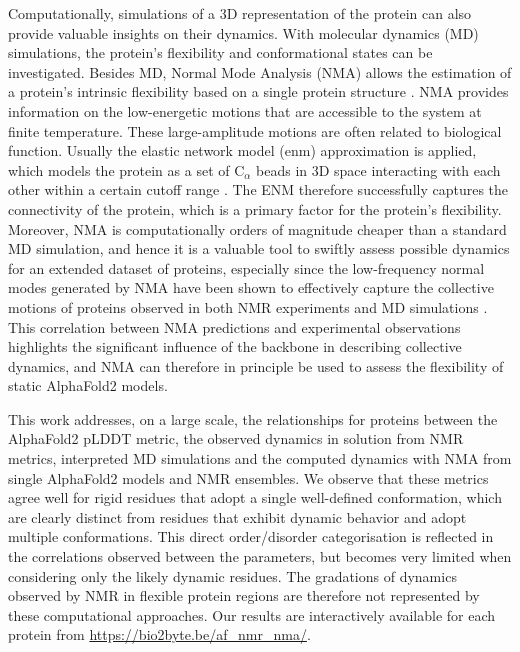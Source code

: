 Computationally, simulations of a 3D representation of the protein can also provide valuable insights on their dynamics. With molecular dynamics (MD) simulations, the protein's flexibility and conformational states can be investigated. Besides MD, Normal Mode Analysis (NMA) allows the estimation of a protein's intrinsic flexibility based on a single protein structure \cite{bahar2010normal}. NMA provides information on the low-energetic motions that are accessible to the system at finite temperature. These large-amplitude motions are often related to biological function. Usually the elastic network model (\gls{enm}) approximation is applied, which models the protein as a set of C$_\alpha$ beads in 3D space interacting with each other within a certain cutoff range \cite{tiwari2014webnm}. The ENM therefore successfully captures the connectivity of the protein, which is a primary factor for the protein's flexibility. Moreover, NMA is computationally orders of magnitude cheaper than a standard MD simulation, and hence it is a valuable tool to swiftly assess possible dynamics for an extended dataset of proteins, especially since the low-frequency normal modes generated by NMA have been shown to effectively capture the collective motions of proteins observed in both NMR experiments and MD simulations \cite{atilgan2001anisotropy, brueschweiler1992normal, doruker2002dynamics, haliloglu1999structure}. This correlation between NMA predictions and experimental observations highlights the significant influence of the backbone in describing collective dynamics, and NMA can therefore in principle be used to assess the flexibility of static AlphaFold2 models.

This work addresses, on a large scale, the relationships for proteins between the AlphaFold2 pLDDT metric, the observed dynamics in solution from NMR metrics, interpreted MD simulations and the computed dynamics with NMA from single AlphaFold2 models and NMR ensembles. We observe that these metrics agree well for rigid residues that adopt a single well-defined conformation, which are clearly distinct from residues that exhibit dynamic behavior and adopt multiple conformations. This direct order/disorder categorisation is reflected in the correlations observed between the parameters, but becomes very limited when considering only the likely dynamic residues. The gradations of dynamics observed by NMR in flexible protein regions are therefore not represented by these computational approaches. Our results are interactively available for each protein from \url{https://bio2byte.be/af_nmr_nma/}.


